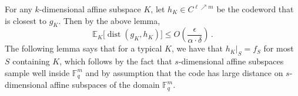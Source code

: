 \documentclass{toc}
\theoremstyle{plain}
\DeclareMathOperator{\dist}{dist} %
\newcommand{\E}{{\mathbb{E}}}
\newcommand{\F}{{\mathbb{F}}}
\begin{document}
For any $k$-dimensional affine subspace $K$, let $h_K \in C^{\ell \nearrow m}$ be the codeword that is closest to $g_K$. Then by the above lemma,
\[\mathbb{E}_{K}\big[\dist(g_K,h_K)\big] \leq   O\left(\frac{\epsilon} {\alpha \cdot \delta}\right)\,.\]
The following lemma says that for a typical $K$, we have that $h_K|_S = f_S$ for most $S$ containing $K$, which follows by the fact that $s$-dimensional affine subspaces sample well inside $\F_q^m$ and by assumption that
the code
has large distance %
on $s$-dimensional affine subspaces
of the domain $\F_q^m$.   %
%

\end{document}
